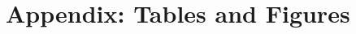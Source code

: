 \documentclass[12pt,a4paper,onecolumn]{article}
\begin{document}
\pagebreak
\appendix
\renewcommand{\theequation}{\Alph{chapter}.\arabic{equation}}

\setcounter{figure}{0}
\setcounter{table}{0}
\makeatletter 
\renewcommand{\thefigure}{A.\@arabic\c@figure}
\renewcommand{\thetable}{A.\@arabic\c@table}

\section{Appendix: Tables and Figures}\label{sec:appendix_tables} 
\end{document}
